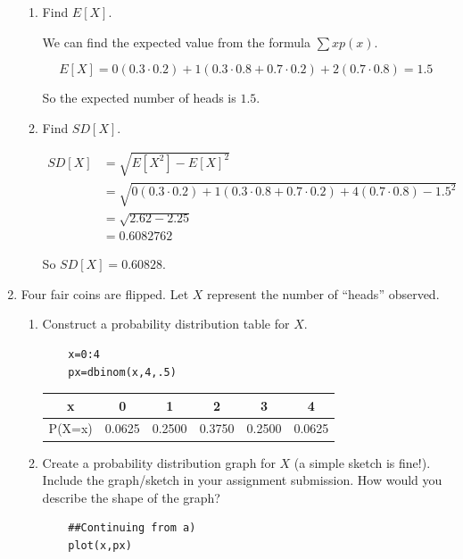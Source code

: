 \documentclass{article}
\begin{document}
\begin{enumerate}
\begin{enumerate}[label= (\alph*)] 
\item Find $E[X]$.

We can find the expected value from the formula $\sum xp(x)$.

\[E[X]=0(0.3\cdot0.2)+1(0.3\cdot0.8+0.7\cdot0.2)+2(0.7\cdot0.8)=1.5\]

So the expected number of heads is $1.5$.

\item Find $SD[X]$.

\begin{align*}
    SD[X]&=\sqrt{E[X^2]-E[X]^2}\\
    &=\sqrt{0(0.3\cdot0.2)+1(0.3\cdot0.8+0.7\cdot0.2)+4(0.7\cdot0.8)-1.5^2}\\
    &=\sqrt{2.62-2.25}\\
    &=0.6082762
\end{align*}

So $SD[X]=0.60828$.

\end{enumerate}
\newpage
\item Four fair coins are flipped. Let $X$ represent the number of “heads” observed.
\begin{enumerate}[label= (\alph*)] 
 
\item Construct a probability distribution table for $X$.

\begin{verbatim}
    x=0:4
    px=dbinom(x,4,.5)
\end{verbatim}

\begin{center}
\begin{tabular}{|c|c|c|c|c|c|}
\hline
x & 0& 1 &2&3&4\\
\hline
P(X=x)&  0.0625 & 0.2500 & 0.3750 & 0.2500 & 0.0625 \\
\hline
\end{tabular}
\end{center}
\item Create a probability distribution graph for $X$ (a simple sketch is fine!). Include the
graph/sketch in your assignment submission. How would you describe the shape of the graph?

\begin{verbatim}
    ##Continuing from a)
    plot(x,px)
\end{verbatim}


\end{enumerate}
\end{enumerate}
\end{document}
